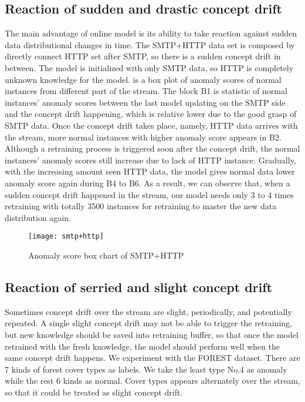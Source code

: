 \subsection{Reaction of sudden and drastic concept drift}
\label{sec:reaction}
The main advantage of online model is its ability to take reaction against sudden data distributional changes in time. The SMTP+HTTP data set is composed by directly connect HTTP set after SMTP, so there is a sudden concept drift in between. The model is initialized with only SMTP data, so HTTP is completely unknown knowledge for the model.  is a box plot of anomaly scores of normal instances from different part of the stream. The block B1 is  statistic of normal instances’ anomaly scores between the last model updating on the SMTP side and the concept drift happening, which is relative lower due to the good grasp of SMTP data. Once the concept drift takes place, namely, HTTP data arrives with the stream, more normal instances with higher anomaly score appears in B2. Although a retraining process is triggered soon after the concept drift, the normal instances’ anomaly scores still increase due to lack of HTTP instance. Gradually, with the increasing amount seen HTTP data, the model gives normal data lower anomaly score again during B4 to B6. As a result, we can observe that, when a sudden concept drift happened in the stream, our model needs only 3 to 4 times retraining with totally 3500 instances for retraining to master the new data distribution again.

\begin{figure}[h]
\centering
\texttt{[image: smtp+http]}
\caption[Anomaly score box chart of SMTP+HTTP]{Anomaly score box chart of SMTP+HTTP}
\label{fig:smtp+http}
\end{figure}

\subsection{Reaction of serried and slight concept drift}
\label{sec:reaction}

Sometimes concept drift over the stream are slight, periodically, and potentially repeated. A single slight concept drift may not be able to trigger the retraining, but new knowledge should be saved into retraining buffer, so that once the model retrained with the fresh knowledge, the model should perform well when the same concept drift happens. We experiment with the FOREST dataset. There are 7 kinds of forest cover types as labels. We take the least type No.4 as anomaly while the rest 6 kinds as normal. Cover types appears alternately over the stream, so that it could be treated as slight concept drift.\\

